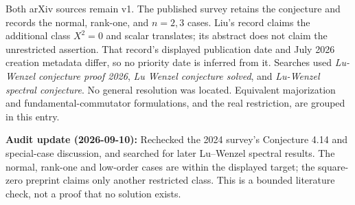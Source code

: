 \documentclass[11pt,a4paper]{article}
\begin{document}
Both arXiv sources remain v1. The published survey retains the
conjecture and records the normal, rank-one, and \(n=2,3\) cases. Liu's
record claims the additional class \(X^2=0\) and scalar translates; its
abstract does not claim the unrestricted assertion. That record's
displayed publication date and July 2026 creation metadata differ, so no
priority date is inferred from it. Searches used
\textit{Lu-Wenzel conjecture proof 2026},
\textit{Lu Wenzel conjecture solved}, and
\textit{Lu-Wenzel spectral conjecture}. No general resolution was
located. Equivalent majorization and fundamental-commutator
formulations, and the real restriction, are grouped in this entry.

\textbf{Audit update (2026-09-10):} Rechecked the 2024 survey's
Conjecture 4.14 and special-case discussion, and searched for later
Lu--Wenzel spectral results. The normal, rank-one and low-order cases
are within the displayed target; the square-zero preprint claims only
another restricted class. This is a bounded literature check, not a
proof that no solution exists.
\end{document}
